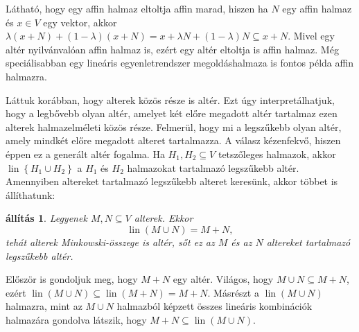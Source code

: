 \documentclass[a4paper, showtrims]{memoir}
\makeatletter
\renewenvironment{proof}[1][\proofname]
    {\par\pushQED{\qed}%
    \normalfont \topsep6\p@\@plus6\p@\relax
    \trivlist
    \item[\hskip\labelsep
        \itshape
    #1\@addpunct{:}]\ignorespaces}
    {\popQED\endtrivlist\@endpefalse}
\theoremstyle{plain}
\newtheorem{proposition}{állítás}[chapter]
\theoremstyle{remark}
\theoremstyle{definition}
\DeclareMathOperator{\lin}{lin}
\makeatother
\begin{document}
Látható, hogy egy affin halmaz eltoltja affin marad,
hiszen ha
$N$ egy affin halmaz és $x\in V$ egy vektor,
akkor
$
	\lambda\left( x+N \right)+\left( 1-\lambda \right)\left( x+N \right)
	=
	x+\lambda N+\left( 1-\lambda \right)N
	\subseteq
	x+N
$.
Mivel egy altér nyilvánvalóan affin halmaz is,
ezért egy altér eltoltja is affin halmaz.
Még speciálisabban egy lineáris egyenletrendszer megoldáshalmaza is fontos példa affin halmazra.

Láttuk korábban, hogy alterek közös része is altér.
Ezt úgy interpretálhatjuk, hogy a legbővebb olyan altér,
amelyet két előre megadott altér tartalmaz ezen alterek halmazelméleti közös része.
Felmerül, hogy mi a legszűkebb olyan altér, amely mindkét előre megadott alteret tartalmazza.
A válasz kézenfekvő, hiszen éppen ez a generált altér fogalma.
Ha $H_1,H_2\subseteq V$ tetszőleges halmazok, akkor
$\lin\left\{ H_1\cup H_2 \right\}$ a $H_1$ és $H_2$ halmazokat tartalmazó legszűkebb altér.
Amennyiben altereket tartalmazó legszűkebb alteret keresünk,
akkor többet is állíthatunk:
\begin{proposition}
	Legyenek $M,N\subseteq V$ alterek.
	Ekkor
    \[
	    \lin(M\cup N)=M+N,
    \]
	tehát alterek Minkowski-összege is altér, 
    sőt ez az $M$ és az $N$ altereket tartalmazó legszűkebb altér.
\end{proposition}
\begin{proof}
    Először is gondoljuk meg, hogy $M+N$ egy altér.
    Világos, hogy $M\cup N\subseteq M+N$,
    ezért $\lin\left( M\cup N \right)\subseteq \lin\left( M+N \right)=M+N$.
    Másrészt a $\lin\left( M\cup N \right)$ halmazra, 
    mint az $M\cup N$ halmazból képzett összes lineáris kombinációk halmazára gondolva
    látszik, hogy $M+N\subseteq \lin\left( M\cup N \right)$.
\end{proof}
\end{document}
